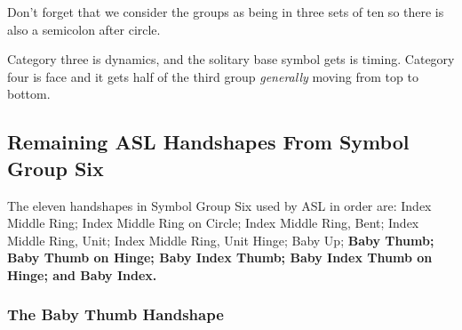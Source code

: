 \documentclass{article}
\begin{document}
Don't forget that we consider the groups as being in three sets of ten so there is also a semicolon after circle.

Category three is dynamics, and the solitary base symbol gets is timing.
Category four is face and it gets half of the third group \emph{generally} moving from top to bottom.

\subsection{Remaining ASL Handshapes From Symbol Group Six}

The eleven handshapes in Symbol Group Six used by ASL in order are:
Index Middle Ring;
Index Middle Ring on Circle;
Index Middle Ring, Bent;
Index Middle Ring, Unit;
Index Middle Ring, Unit Hinge;
Baby Up;
{\bf
Baby Thumb;
Baby Thumb on Hinge;
Baby Index Thumb;
Baby Index Thumb on Hinge;
and Baby Index.
}

\subsubsection{The Baby Thumb Handshape}
\end{document}
